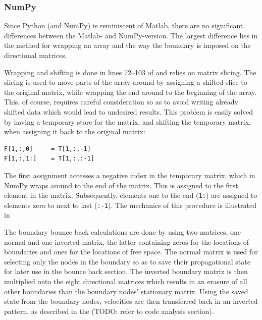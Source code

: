 \subsubsection{NumPy}
Since Python (and NumPy) is reminiscent of Matlab, there are no significant differences between the Matlab- and NumPy-version. The largest difference lies in the method for wrapping an array and the way the boundary is imposed on the directional matrices.

Wrapping and shifting is done in lines 72--103 of  and relies on matrix slicing. The slicing is used to move parts of the array around by assigning a shifted slice to the original matrix, while wrapping the end around to the beginning of the array. This, of course, requires careful consideration so as to avoid writing already shifted data which would lead to undesired results. This problem is easily solved by having a temporary store for the matrix, and shifting the temporary matrix, when assigning it back to the original matrix:

\begin{verbatim}
F[1,:,0]     = T[1,:,-1]
F[1,:,1:]    = T[1,:,:-1]
\end{verbatim}

The first assignment accesses a negative index in the temporary matrix, which in NumPy wraps around to the end of the matrix. This is assigned to the first element in the matrix. Subsequently, elements one to the end (\texttt{1:}) are assigned to elements zero to next to last (\texttt{:-1}). The mechanics of this procedure is illustrated in 


The boundary bounce back calculations are done by using two matrices, one normal and one inverted matrix, the latter containing zeros for the locations of boundaries and ones for the locations of free space. The normal matrix is used for selecting only the nodes in the boundary so as to save their propagational state for later use in the bounce back section. The inverted boundary matrix is then multiplied onto the eight directional matrices which results in an erasure of all other boundaries than the boundary nodes' stationary matrix. Using the saved state from the boundary nodes, velocities are then transferred back in an inverted pattern, as described in the (TODO: refer to code analysis section).




